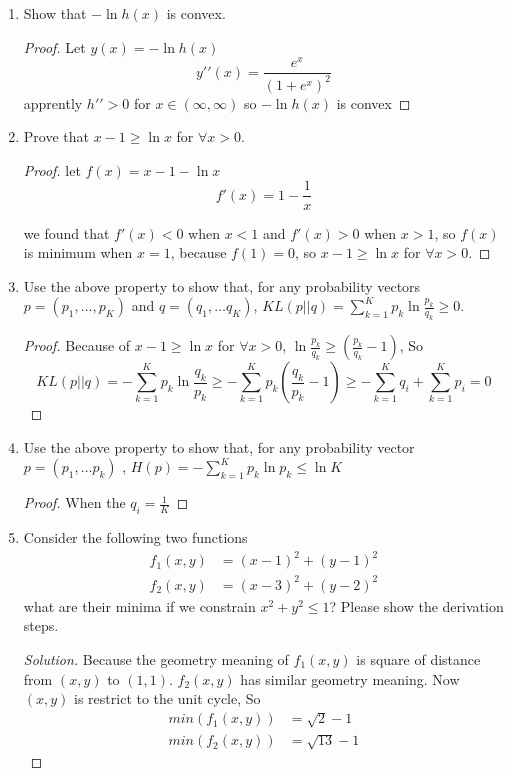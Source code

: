 \documentclass{article}
\newenvironment{solution}
  {\renewcommand\qedsymbol{$\blacksquare$}\begin{proof}[Solution]}
  {\end{proof}}
\begin{document}
\begin{enumerate}
\begin{proof}
    $h\prime\prime < 0$ for $x \in (\infty, 0)$ and
    $h\prime\prime > 0$ for $x \in (\infty, 0)$
    So $h(x)=\frac{1}{1+e^{-x}}$ is neither convex or concave.

\end{proof}
\bigskip
\item Show that $-\ln h(x)$ is convex.
\begin{proof}
    Let $y(x) = -\ln h(x)$
    \[y\prime\prime(x) =  \frac{e^{x}}{(1 + e^{x})^{2}}\]
    apprently $h\prime\prime > 0$ for $x \in (\infty, \infty)$
    so $-\ln h(x)$ is convex

\end{proof}
\bigskip
\item Prove that $x-1\geq \ln x$ for $\forall x>0$.
\begin{proof}
    let $f(x) = x - 1 - \ln{x}$
    \[
        f\prime(x) = 1 - \frac{1}{x}
    \]

    we found  that $f\prime(x) < 0$ when $x < 1$ and $f\prime(x) > 0$ when $x >
    1$, so $f(x)$ is minimum when $x=1$, because $f(1) = 0$, so $x-1\geq \ln x$
    for $\forall x>0$.

\end{proof}
\bigskip
\item Use the above property to show that, for any probability vectors $p=(p_1,\ldots ,p_K)$ and $q=(q_1,\ldots q_K)$,
$KL(p||q)=\sum_{k=1}^{K}p_k\ln\frac{p_k}{q_k}\geq0$.
\begin{proof}
    Because of $x-1\geq \ln x$ for $\forall x>0$, $\ln\frac{p_k}{q_k} \geq
    (\frac{p_k}{q_k} - 1)$, So
    \[
        KL(p||q) =
        -\sum_{k=1}^{K}p_k\ln\frac{q_k}{p_k} \geq
        -\sum_{k=1}^{K}p_k(\frac{q_k}{p_k} - 1)
        \geq
        -\sum_{k=1}^{K}q_i + \sum_{k=1}^{K}p_i
        = 0
    \]
\end{proof}
\bigskip
\item Use the above property to show that, for any probability vector $p=(p_1,\ldots p_k)$ ,
$H(p)=-\sum_{k=1}^{K}p_k \ln p_k \le \ln K$
\begin{proof}
    When the $q_i = \frac{1}{K}$
\end{proof}
\bigskip
\item Consider the following two functions
\begin{align*}
f_1(x,y)&=(x-1)^2+(y-1)^2\\
f_2(x,y)&=(x-3)^2+(y-2)^2
\end{align*}
what are their minima if we constrain $x^2+y^2\leq 1$? Please show the derivation steps.
\begin{solution}
    Because the geometry meaning of  $f_1(x,y)$ is square of distance from $(x,
    y)$ to $(1, 1)$. $f_2(x,y)$ has similar geometry meaning. Now $(x, y)$ is
    restrict to the unit cycle, So
    \begin{align*}
        min(f_1(x,y))&=\sqrt{2} - 1\\
        min(f_2(x,y))&=\sqrt{13} - 1
    \end{align*}


\end{solution}
\end{enumerate}
\end{document}
